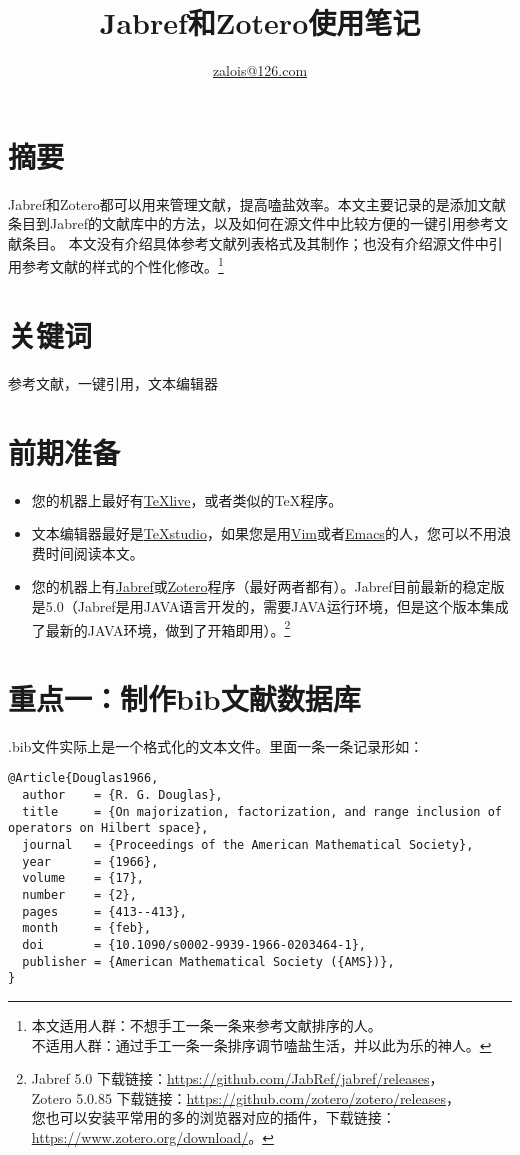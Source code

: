 \documentclass[cn,geye,cyan,normal,14pt]{elegantnote}
\title{Jabref和Zotero使用笔记}
\author{\href{mailto:zalois@126.com}{zalois@126.com}}
\institute{欢迎自由修改分享交流}
\date{\zhtoday}
\begin{document}
\maketitle
\section{摘要}
Jabref和Zotero都可以用来管理文献，提高嗑盐效率。本文主要记录的是添加文献条目到Jabref的文献库中的方法，以及如何在源文件中比较方便的一键引用参考文献条目。
本文没有介绍具体参考文献列表格式及其制作；也没有介绍源文件中引用参考文献的样式的个性化修改。\footnote{本文适用人群：不想手工一条一条来参考文献排序的人。%
\\不适用人群：通过手工一条一条排序调节嗑盐生活，并以此为乐的神人。}
\section{关键词}
参考文献，一键引用，文本编辑器
\section{前期准备}
\begin{itemize}
	\item 您的机器上最好有\href{https://www.tug.org/texlive/}{\TeX live}，或者类似的\TeX 程序。
	\item 文本编辑器最好是\href{https://github.com/texstudio-org/texstudio/releases}{\TeX studio}，如果您是用\href{https://github.com/vim/vim/releases}{Vim}或者\href{https://ftp.gnu.org/gnu/emacs/}{Emacs}的人，您可以不用浪费时间阅读本文。
	\item 您的机器上有\href{https://github.com/JabRef/jabref/releases}{Jabref}或\href{https://github.com/zotero/zotero/releases}{Zotero}程序（最好两者都有）。Jabref目前最新的稳定版是5.0（Jabref是用JAVA语言开发的，需要JAVA运行环境，但是这个版本集成了最新的JAVA环境，做到了开箱即用）。\footnote{Jabref 5.0 下载链接：\url{https://github.com/JabRef/jabref/releases}，\\
		Zotero 5.0.85 下载链接：\url{https://github.com/zotero/zotero/releases}，\\
		您也可以安装平常用的多的浏览器对应的插件，下载链接：\url{https://www.zotero.org/download/}。}
\end{itemize}
\section{重点一：制作bib文献数据库}
.bib文件实际上是一个格式化的文本文件。里面一条一条记录形如：
\begin{lstlisting}
@Article{Douglas1966,
  author    = {R. G. Douglas},
  title     = {On majorization, factorization, and range inclusion of operators on Hilbert space},
  journal   = {Proceedings of the American Mathematical Society},
  year      = {1966},
  volume    = {17},
  number    = {2},
  pages     = {413--413},
  month     = {feb},
  doi       = {10.1090/s0002-9939-1966-0203464-1},
  publisher = {American Mathematical Society ({AMS})},
}
\end{lstlisting}
\end{document}
